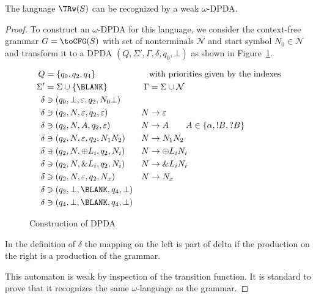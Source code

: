 \begin{proposition}\label{prop:trace-is-weak-wpda}
  The language $\TRw (S)$ can be recognized by a weak $\omega$-DPDA.
\end{proposition}
\begin{proof}
  To construct an $\omega$-DPDA for this language, we consider the context-free grammar $G = \toCFG
  (S)$ with set of nonterminals $\mathcal{N}$ and start symbol $N_0 \in \mathcal{N}$ and transform
  it to a DPDA $(Q, \Sigma', \Gamma, \delta, q_0, \bot)$ as shown in Figure~\ref{fig:construction-of-dpda}. 
  \begin{figure}[t]
    \begin{align*}
      Q & = \{q_0, q_2, q_4 \} && \text{with priorities given by the indexes} \\
      \Sigma' & = \Sigma \cup \{ \BLANK \} &
      \Gamma & = \Sigma \cup \mathcal{N} \\
      \delta & \ni (q_0, \bot, \varepsilon, q_2, N_0\bot)  && \\
      \delta & \ni (q_2, N, \varepsilon, q_2, \varepsilon)  & N & \to \varepsilon\\
      \delta & \ni (q_2, N, A, q_2, \varepsilon)  & N & \to A \qquad A \in \{\alpha, !B, ?B \}\\
      \delta & \ni (q_2, N, \varepsilon, q_2, N_1N_2)  & N & \to N_1N_2\\
      \delta & \ni (q_2, N, \oplus L_i, q_2, N_i)  & N& \to \oplus L_iN_i\\
      \delta & \ni (q_2, N, \& L_i, q_2, N_i)  & N& \to \& L_iN_i\\
      \delta & \ni (q_2, N, \varepsilon, q_2, N_x)  & N& \to N_x\\
      \delta & \ni (q_2, \bot, \BLANK, q_4, \bot) \\
      \delta & \ni (q_4, \bot, \BLANK, q_4, \bot) 
    \end{align*}
    \caption{Construction of DPDA}
    \label{fig:construction-of-dpda}
  \end{figure}
In the definition  of $\delta$ the mapping on the left is part of delta if the production on the
right is a production of the grammar.

This automaton is weak by inspection of the transition function. It is standard to prove that it recognizes the same
$\omega$-language as the grammar.
\end{proof}

